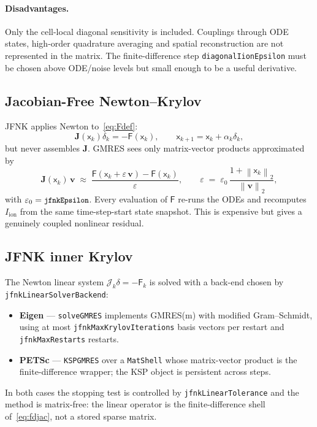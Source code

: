 \documentclass[11pt,a4paper]{article}
\newcommand{\code}[1]{\texttt{\small #1}}
\newcommand{\Iion}{I_{\mathrm{ion}}}
\newcommand{\Fres}{\mathsf{F}}
\newcommand{\norm}[1]{\left\lVert #1 \right\rVert}
\begin{document}
\paragraph{Disadvantages.}
Only the cell-local diagonal sensitivity is included. Couplings through
ODE states, high-order quadrature averaging and spatial reconstruction
are not represented in the matrix. The finite-difference step
\code{diagonalIionEpsilon} must be chosen above ODE/noise levels but
small enough to be a useful derivative.

\subsection{Jacobian-Free Newton--Krylov}

JFNK applies Newton to~\eqref{eq:Fdef}:
\[
  \mathbf{J}(\mathsf{x}_k)\delta_k
  =
  -\Fres(\mathsf{x}_k),
  \qquad
  \mathsf{x}_{k+1}=\mathsf{x}_k+\alpha_k\delta_k,
\]
but never assembles $\mathbf{J}$. GMRES sees only matrix-vector
products approximated by
\begin{equation}
  \mathbf{J}(\mathsf{x}_{k})\, \mathbf{v}
   \;\approx\;
   \frac{\Fres(\mathsf{x}_{k} + \varepsilon\, \mathbf{v})
         - \Fres(\mathsf{x}_{k})}{\varepsilon},
   \qquad
   \varepsilon \;=\; \varepsilon_{0}\,
                     \frac{1 + \norm{\mathsf{x}_{k}}_{2}}
                          {\norm{\mathbf{v}}_{2}},
   \label{eq:fdjac}
\end{equation}
with $\varepsilon_{0}=\code{jfnkEpsilon}$. Every evaluation of
$\Fres$ re-runs the ODEs and recomputes $\Iion$ from the same
time-step-start state snapshot. This is expensive but gives a genuinely
coupled nonlinear residual.

\subsection{JFNK inner Krylov}
\label{sec:jfnk-krylov}

The Newton linear system $\mathcal{J}_k\delta=-\Fres_k$ is
solved with a back-end chosen by \code{jfnkLinearSolverBackend}:
\begin{itemize}[nosep]
\item \textbf{Eigen} --- \code{solveGMRES} implements GMRES(m) with modified
  Gram--Schmidt, using at most \code{jfnkMaxKrylovIterations} basis vectors per
  restart and \code{jfnkMaxRestarts} restarts.
\item \textbf{PETSc} --- \code{KSPGMRES} over a \code{MatShell} whose
  matrix-vector product is the finite-difference wrapper; the KSP object is
  persistent across steps.
\end{itemize}
In both cases the stopping test is controlled by \code{jfnkLinearTolerance} and the
method is matrix-free: the linear operator is the finite-difference
shell of~\eqref{eq:fdjac}, not a stored sparse matrix.
\end{document}
